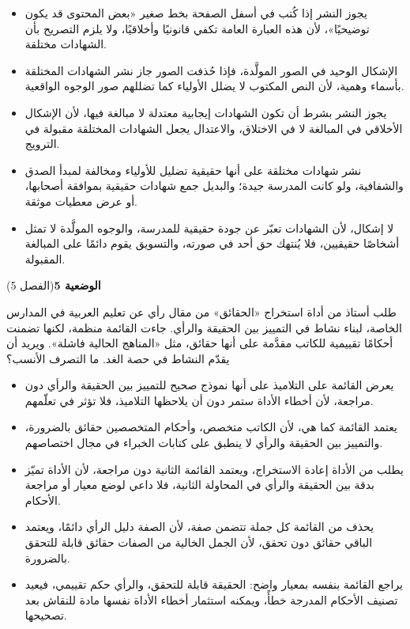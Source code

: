 \documentclass[11pt,a4paper]{article}
\begin{document}
\begin{itemize}[leftmargin=1.0cm, labelsep=6pt, itemsep=3pt, topsep=4pt, parsep=0pt]
  \item[\textbf{أ)}] يجوز النشر إذا كُتب في أسفل الصفحة بخط صغير «بعض المحتوى قد يكون توضيحيًا»، لأن هذه العبارة العامة تكفي قانونيًا وأخلاقيًا، ولا يلزم التصريح بأن الشهادات مختلقة.
  \item[\textbf{ب)}] الإشكال الوحيد في الصور المولَّدة، فإذا حُذفت الصور جاز نشر الشهادات المختلقة بأسماء وهمية، لأن النص المكتوب لا يضلل الأولياء كما تضللهم صور الوجوه الواقعية.
  \item[\textbf{ج)}] يجوز النشر بشرط أن تكون الشهادات إيجابية معتدلة لا مبالغة فيها، لأن الإشكال الأخلاقي في المبالغة لا في الاختلاق، والاعتدال يجعل الشهادات المختلقة مقبولة في الترويج.
  \item[\textbf{د)}] نشر شهادات مختلقة على أنها حقيقية تضليل للأولياء ومخالفة لمبدأ الصدق والشفافية، ولو كانت المدرسة جيدة؛ والبديل جمع شهادات حقيقية بموافقة أصحابها، أو عرض معطيات موثقة.
  \item[\textbf{هـ)}] لا إشكال، لأن الشهادات تعبّر عن جودة حقيقية للمدرسة، والوجوه المولَّدة لا تمثل أشخاصًا حقيقيين، فلا يُنتهك حق أحد في صورته، والتسويق يقوم دائمًا على المبالغة المقبولة.
\end{itemize}
\par\vspace{6pt}
\noindent
{\large\khatt\textbf{الوضعية 5}}\hfill{\small(الفصل 5)}\par\nopagebreak\vspace{3pt}
\setlength{\fboxsep}{7pt}\colorbox{gray!10}{\parbox{\dimexpr\linewidth-14pt}{طلب أستاذ من أداة استخراج «الحقائق» من مقال رأي عن تعليم العربية في المدارس الخاصة، لبناء نشاط في التمييز بين الحقيقة والرأي. جاءت القائمة منظمة، لكنها تضمنت أحكامًا تقييمية للكاتب مقدَّمة على أنها حقائق، مثل «المناهج الحالية فاشلة». ويريد أن يقدّم النشاط في حصة الغد. ما التصرف الأنسب؟}}\par\nopagebreak
\begin{itemize}[leftmargin=1.0cm, labelsep=6pt, itemsep=3pt, topsep=4pt, parsep=0pt]
  \item[\textbf{أ)}] يعرض القائمة على التلاميذ على أنها نموذج صحيح للتمييز بين الحقيقة والرأي دون مراجعة، لأن أخطاء الأداة ستمر دون أن يلاحظها التلاميذ، فلا تؤثر في تعلّمهم.
  \item[\textbf{ب)}] يعتمد القائمة كما هي، لأن الكاتب متخصص، وأحكام المتخصصين حقائق بالضرورة، والتمييز بين الحقيقة والرأي لا ينطبق على كتابات الخبراء في مجال اختصاصهم.
  \item[\textbf{ج)}] يطلب من الأداة إعادة الاستخراج، ويعتمد القائمة الثانية دون مراجعة، لأن الأداة تميّز بدقة بين الحقيقة والرأي في المحاولة الثانية، فلا داعي لوضع معيار أو مراجعة الأحكام.
  \item[\textbf{د)}] يحذف من القائمة كل جملة تتضمن صفة، لأن الصفة دليل الرأي دائمًا، ويعتمد الباقي حقائق دون تحقق، لأن الجمل الخالية من الصفات حقائق قابلة للتحقق بالضرورة.
  \item[\textbf{هـ)}] يراجع القائمة بنفسه بمعيار واضح: الحقيقة قابلة للتحقق، والرأي حكم تقييمي، فيعيد تصنيف الأحكام المدرجة خطأً، ويمكنه استثمار أخطاء الأداة نفسها مادة للنقاش بعد تصحيحها.
\end{itemize}
\end{document}
